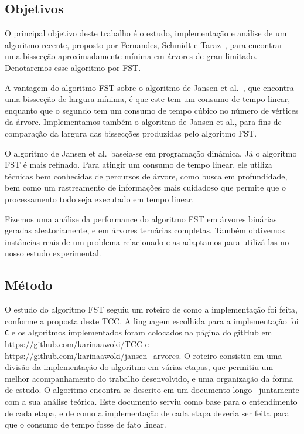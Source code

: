 \subsection{Objetivos} 

O principal objetivo deste trabalho é o estudo, implementação e 
análise de um algoritmo recente, proposto por Fernandes, Schmidt e 
Taraz~\cite{FernandesST13}, para encontrar uma bissecção 
aproximadamente mínima em árvores de grau limitado. Denotaremos
esse algoritmo por FST. 

A vantagem do algoritmo FST sobre o algoritmo de Jansen et 
al.~\cite{JansenKLS01}, que encontra uma bissecção de largura 
mínima, é que este tem um consumo de tempo linear, enquanto que o 
segundo tem um consumo de tempo cúbico no número de vértices da 
árvore. 
Implementamos também o algoritmo de Jansen et al., para fins de 
comparação da largura das bissecções produzidas pelo algoritmo
FST. 

O algoritmo de Jansen et al.\ baseia-se em 
programação dinâmica. 
Já o algoritmo FST é mais refinado. 
Para atingir um consumo de tempo 
linear, ele utiliza técnicas bem conhecidas de percursos de árvore, 
como busca em profundidade, bem como um rastreamento de 
informações mais cuidadoso que permite que o processamento todo 
seja executado em tempo linear. 

Fizemos uma análise 
da performance do algoritmo FST em árvores binárias geradas 
aleatoriamente, e 
em árvores ternárias completas.
Também obtivemos instâncias reais de um problema relacionado e as
adaptamos para 
utilizá-las no nosso estudo experimental.
 

\bigskip
\bigskip


\subsection{Método}

O estudo do algoritmo FST seguiu um roteiro de
como a implementação foi feita, conforme a proposta deste TCC. 
A linguagem escolhida para a implementação foi \texttt{C} e os 
algoritmos implementados foram colocados na página do gitHub
em \url{https://github.com/karinaawoki/TCC} e
\url{https://github.com/karinaawoki/jansen_arvores}. 
O roteiro consistiu em uma divisão da implementação do algoritmo 
em várias etapas, que permitiu um melhor acompanhamento do 
trabalho desenvolvido, e uma organização da forma de estudo. 
O algoritmo encontra-se descrito em um documento 
longo~\cite{Schmidt15} juntamente com a sua análise teórica. 
Este documento serviu como base para o entendimento de cada 
etapa, e de como a implementação de cada etapa deveria ser feita 
para que o consumo de tempo fosse de fato linear. 


